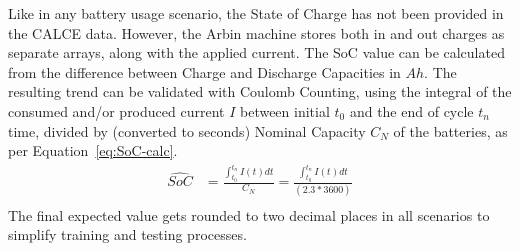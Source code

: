 %
Like in any battery usage scenario, the State of Charge has not been provided in the CALCE data.
However, the Arbin machine stores both in and out charges as separate arrays, along with the applied current.
The SoC value can be calculated from the difference between Charge and Discharge Capacities in $Ah$.
The resulting trend can be validated with Coulomb Counting, using the integral of the consumed and/or produced current $I$ between initial $t_0$ and the end of cycle $t_n$ time, divided by (converted to seconds) Nominal Capacity $C_{N}$ of the batteries, as per \mbox{Equation~\ref{eq:SoC-calc}}.
\begin{equation}
    \begin{split}
        \hat{SoC} &= \frac{\int_{t_0}^{t_n} I(t)dt} {C_{N}} = \frac{\int_{t_0}^{t_n} I(t)dt} {(2.3*3600)} \\
        \label{eq:SoC-calc}
    \end{split}
\end{equation}
The final expected value gets rounded to two decimal places in all scenarios to simplify training and testing processes.

